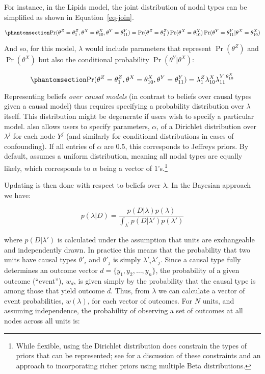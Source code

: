 \documentclass[
  11pt,
  article]{jss}
\begin{document}
For instance, in the Lipids model, the joint distribution of nodal types
can be simplified as shown in Equation~\ref{eq-join}.

\begin{equation}\phantomsection\label{eq-join}{
\Pr(\theta^Z = \theta^Z_1, \theta^X = \theta^X_{10}, \theta^Y = \theta^Y_{11}) =
\Pr(\theta^Z = \theta^Z_1)\Pr(\theta^X = \theta^X_{10})\Pr(\theta^Y = \theta^Y_{11}|\theta^X = \theta^X_{10})
}\end{equation}

And so, for this model, \(\lambda\) would include parameters that
represent \(\Pr(\theta^Z)\) and \(\Pr(\theta^X)\) but also the
conditional probability \(\Pr(\theta^Y|\theta^X)\):

\begin{equation}\phantomsection\label{eq-join2}{
\Pr(\theta^Z = \theta^Z_1, \theta^X = \theta^X_{10}, \theta^Y = \theta^Y_{11}) =
\lambda^Z_1\lambda^X_{10}\lambda^{Y|\theta^X_{10}}_{11}
}\end{equation}

Representing beliefs \emph{over causal models} (in contrast to beliefs
over causal types given a causal model) thus requires specifying a
probability distribution over \(\lambda\) itself. This distribution
might be degenerate if users wish to specify a particular model.
 also allows users to specify parameters, \(\alpha\),
of a Dirichlet distribution over \(\lambda^j\) for each node \(Y^j\)
(and similarly for conditional distributions in cases of confounding).
If all entries of \(\alpha\) are \(0.5\), this corresponds to Jeffreys
priors. By default,  assumes a uniform distribution,
meaning all nodal types are equally likely, which corresponds to
\(\alpha\) being a vector of \(1\)'s.\footnote{While flexible, using the
  Dirichlet distribution does constrain the types of priors that can be
  represented; see \citet{irons2023causally} for a discussion of these
  constraints and an approach to incorporating richer priors using
  multiple Beta distributions.}

Updating is then done with respect to beliefs over \(\lambda\). In the
Bayesian approach we have:

\[
p(\lambda|D) = \frac{p(D|\lambda)p(\lambda)}{\int_{\lambda^{'}} p(D|\lambda')p(\lambda')}
\]

where \(p(D|\lambda')\) is calculated under the assumption that units
are exchangeable and independently drawn. In practice this means that
the probability that two units have causal types \(\theta'_i\) and
\(\theta'_j\) is simply \(\lambda'_i\lambda'_j\). Since a causal type
fully determines an outcome vector \(d = \{y_1, y_2,\dots,y_n\}\), the
probability of a given outcome (``event''), \(w_d\), is given simply by
the probability that the causal type is among those that yield outcome
\(d\). Thus, from \(\lambda\) we can calculate a vector of event
probabilities, \(w(\lambda)\), for each vector of outcomes. For \(N\)
units, and assuming independence, the probability of observing a set of
outcomes at all nodes across all units is:
\end{document}

